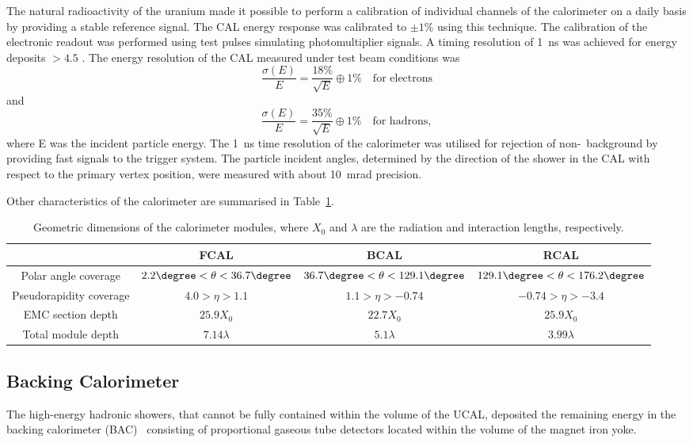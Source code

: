 The natural radioactivity of the uranium made it possible to perform a calibration of individual channels of the calorimeter on a daily basis by providing a stable reference signal. The CAL energy response was calibrated to $\pm 1\%$ using this technique. The calibration of the electronic readout was performed using test pulses simulating photomultiplier signals. A timing resolution of 1~ns was achieved for energy deposits $> 4.5$ \GeV.
The energy resolution of the CAL measured under test beam conditions was 
\begin{equation}
	\frac{\sigma \left(E\right)}{E} = \frac{18\%}{\sqrt{E}} \oplus 1\% \quad \text{for electrons}
\end{equation}
and 
\begin{equation}
	\frac{\sigma \left(E\right)}{E} = \frac{35\%}{\sqrt{E}} \oplus 1\% \quad \text{for hadrons},
\end{equation}
where E was the incident particle energy. The 1~ns time resolution of the calorimeter was utilised for rejection of non-\ep~background by providing fast signals to the trigger system. The particle incident angles, determined by the direction of the shower in the CAL with respect to the primary vertex position, were measured with about 10~mrad precision.

Other characteristics of the \zeus calorimeter are summarised in Table~\ref{tab:calparams}.

\begin{table}[htbp]
	\centering
	{\small
		\begin{tabular}{|c|c|c|c|}
			     \hline
      &FCAL & BCAL & RCAL \\
			\hline
			\hline
			Polar angle coverage & $2.2\degree < \theta < 36.7\degree$ & $36.7\degree < \theta < 129.1\degree$ & $129.1\degree < \theta < 176.2\degree$ \\ \hline
			Pseudorapidity coverage & $4.0 > \eta > 1.1$ & $1.1 > \eta > -0.74$ & $-0.74 > \eta > -3.4$ \\ \hline
			EMC section depth & $25.9 X_0$ & $22.7 X_0$ & $25.9 X_0$ \\ \hline
			Total module depth & $7.14 \lambda$ & $5.1 \lambda$ & $3.99 \lambda$ \\ \hline		
		\end{tabular}
	}
	\caption{Geometric dimensions of the calorimeter modules, where $X_0$ and $\lambda$ are the radiation and interaction lengths, respectively.}
	\label{tab:calparams}
\end{table}

\subsection{Backing Calorimeter}
\label{subsec:bac}
The high-energy hadronic showers, that cannot be fully contained within the volume of the UCAL, deposited the remaining energy in the backing calorimeter (BAC)~\cite{nim:a300:480} consisting of proportional gaseous tube detectors located within the volume of the magnet iron yoke.
